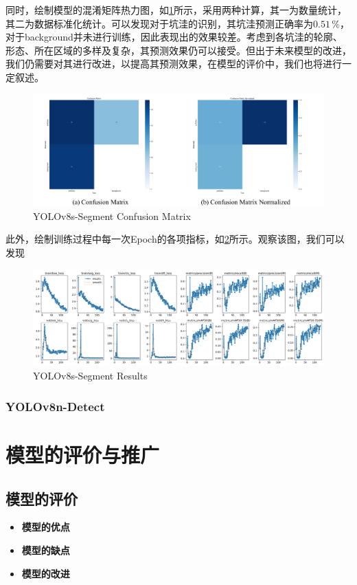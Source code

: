 \documentclass{MathorCupmodeling}
\begin{document}
	同时，绘制模型的混淆矩阵热力图，如\textcolor{blue}{\cref{fig:YOLOv8s-Segment-ConfusionMatrix}}所示，采用两种计算，其一为数量统计，其二为数据标准化统计。可以发现对于坑洼的识别，其坑洼预测正确率为$0.51\,\%$，对于background并未进行训练，因此表现出的效果较差。考虑到各坑洼的轮廓、形态、所在区域的多样及复杂，其预测效果仍可以接受。但出于未来模型的改进，我们仍需要对其进行改进，以提高其预测效果，在模型的评价中，我们也将进行一定叙述。
	\begin{figure}[H]
		\centering
		\includegraphics[scale=0.66]{Figures/segment/SegmentConfusionMatrix.pdf}
		\caption{YOLOv8s-Segment Confusion Matrix}
		\label{fig:YOLOv8s-Segment-ConfusionMatrix}
	\end{figure}
	
	此外，绘制训练过程中每一次Epoch的各项指标，如\textcolor{blue}{\cref{fig:YOLOv8s-Segment-Results}}所示。观察该图，我们可以发现
	\begin{figure}[H]
		\centering
		\includegraphics[scale=0.37]{Figures/segment/SegmentResults.png}
		\caption{YOLOv8s-Segment Results}
		\label{fig:YOLOv8s-Segment-Results}
	\end{figure}
	\subsubsection{YOLOv8n-Detect}
	
	\section{模型的评价与推广}
	\subsection{模型的评价}
	\begin{itemize}
		\item \textbf{模型的优点}

		\item \textbf{模型的缺点}

		\item \textbf{模型的改进}

	\end{itemize}
\end{document}
